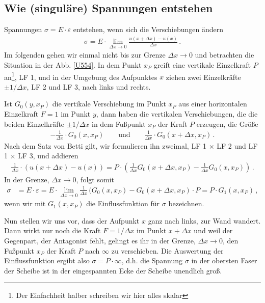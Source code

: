 {\textcolor{sectionTitleBlue}{\section{Wie (singul\"{a}re) Spannungen entstehen}}}
Spannungen $\sigma = E \cdot \varepsilon$ entstehen, wenn sich die Verschiebungen \"{a}ndern
\begin{align}
\sigma = E \cdot \lim_{\Delta x \to 0} \frac{u(x + \Delta x) - u(x)}{\Delta x}\,.
\end{align}
Im folgenden gehen wir einmal nicht bis zur Grenze $\Delta x \to 0$ und betrachten die Situation in der Abb. \ref{U554}. In dem Punkt $x_P $ greift eine vertikale Einzelkraft $P$ an\footnote{Der Einfachheit halber schreiben wir hier alles skalar}, LF 1, und in der Umgebung des Aufpunktes $x$ ziehen zwei Einzelkr\"{a}fte $\pm 1/\Delta x$, LF 2 und LF 3, nach links und rechts.

Ist $G_0(y,x_P)$ die vertikale Verschiebung im Punkt $x_P$ aus einer horizontalen Einzelkraft $F = 1$ im Punkt $y$, dann haben die vertikalen Verschiebungen, die die beiden Einzelkr\"{a}fte $\pm 1/\Delta x$ in dem Fu{\ss}punkt $x_P$ der Kraft $P$ erzeugen, die Gr\"{o}{\ss}e
\begin{align}
-\frac{1}{\Delta x}\cdot G_0(x, x_P) \qquad \text{und} \qquad \frac{1}{\Delta x}\cdot G_0(x + \Delta x, x_P)\,.
\end{align}
Nach dem Satz von Betti gilt, wir formulieren ihn zweimal, LF 1 $\times $ LF 2 und LF 1 $\times $ LF 3, und addieren
\begin{align}
\frac{1}{\Delta x} \cdot(u(x + \Delta x) - u(x)) = P\cdot (\frac{1}{\Delta x} G_0(x + \Delta x, x_P) -\frac{1}{\Delta x} G_0(x, x_P))\,.
\end{align}
In der Grenze, $\Delta x \to 0$, folgt somit
\begin{align}
\sigma &= E \cdot \varepsilon = E \cdot \lim_{\Delta x \to 0} \frac{1}{\Delta x}\,(G_0(x,x_P) - G_0(x + \Delta x, x_P) \cdot P = P \cdot G_1(x,x_P) \,,
\end{align}
wenn wir mit $G_1(x,x_P)$ die Einflussfunktion f\"{u}r $\sigma$ bezeichnen.

Nun stellen wir uns vor, dass der Aufpunkt $x$ ganz nach links, zur Wand wandert. Dann wirkt nur noch die Kraft $F = 1/\Delta x$ im Punkt $x + \Delta x$ und weil der Gegenpart, der Antagonist fehlt, gelingt es ihr in der Grenze, $\Delta x \to 0$, den Fu{\ss}punkt $x_P$ der Kraft $P$ nach $\infty$ zu verschieben. Die Auswertung der Einflussfunktion ergibt also $ \sigma = P \cdot \infty$, d.h. die Spannung $\sigma$ in der obersten Faser der Scheibe ist in der eingespannten Ecke der Scheibe unendlich gro{\ss}.

